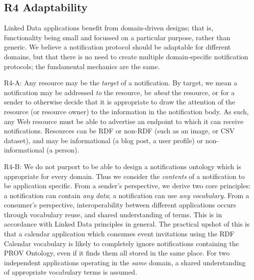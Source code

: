 \documentclass[a4paper]{llncs}
\begin{document}
                            

                            
                                \subsection{R4 Adaptability}
  \label{adaptability}

                                
                                    
                                    
                                    
\par Linked Data applications benefit from domain-driven designs; that is, functionality being small and focussed on a particular purpose, rather than generic. We believe a notification protocol should be adaptable for different domains, but that there is no need to create multiple domain-specific notification protocols; the fundamental mechanics are the same.

                                    
\par R4-A: Any resource may be the {\em target} of a notification. By target, we mean a notification may be addressed {\em to} the resource, be {\em about} the resource, or for a sender to otherwise decide that it is appropriate to draw the attention of the resource (or resource owner) to the information in the notification body. As such, any Web resource must be able to advertise an endpoint to which it can receive notifications. Resources can be RDF or non-RDF (such as an image, or CSV dataset), and may be informational (a blog post, a user profile) or non-informational (a person).

                                    
\par R4-B: We do not purport to be able to design a notifications ontology which is appropriate for every domain. Thus we consider the {\em contents} of a notification to be application specific. From a sender’s perspective, we derive two core principles: a notification can contain {\em any data}; a notification can use {\em any vocabulary}. From a consumer’s perspective, interoperability between different applications occurs through vocabulary reuse, and shared understanding of terms. This is in accordance with Linked Data principles in general. The practical upshot of this is that a calendar application which consumes event invitations using the \empty RDF Calendar vocabulary is likely to completely ignore notifications containing the \empty PROV Ontology, even if it finds them all stored in the same place. For two independent applications operating in the {\em same} domain, a shared understanding of appropriate vocabulary terms is assumed.
\end{document}
